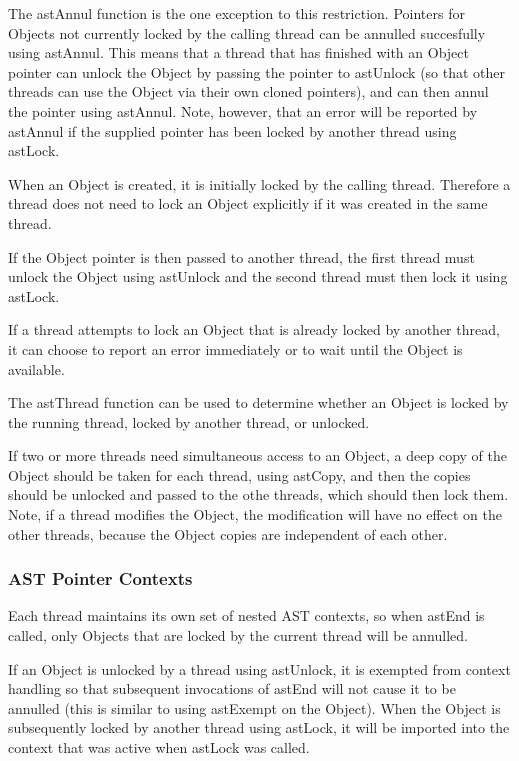 \documentclass[twoside,11pt]{article}
\begin{document}
The astAnnul function is the one exception to this restriction. Pointers
for Objects not currently locked by the calling thread can be annulled
succesfully using astAnnul. This means that a thread that has finished
with an Object pointer can unlock the Object by passing the pointer to
astUnlock (so that other threads can use the Object via their own cloned
pointers), and can then annul the pointer using astAnnul. Note, however,
that an error will be reported by astAnnul if the supplied pointer has
been locked by another thread using astLock.

When an Object is created, it is initially locked by the calling thread.
Therefore a thread does not need to lock an Object explicitly if it was
created in the same thread.

If the Object pointer is then passed to another thread, the first thread
must unlock the Object using astUnlock and the second thread must then lock
it using astLock.

If a thread attempts to lock an Object that is already locked by another
thread, it can choose to report an error immediately or to wait until the
Object is available.

The astThread function can be used to determine whether an Object is
locked by the running thread, locked by another thread, or unlocked.

If two or more threads need simultaneous access to an Object, a deep copy
of the Object should be taken for each thread, using astCopy, and then
the copies should be unlocked and passed to the othe threads, which
should then lock them. Note, if a thread modifies the Object, the
modification will have no effect on the other threads, because the Object
copies are independent of each other.

\subsubsection{AST Pointer Contexts}

Each thread maintains its own set of nested AST contexts, so when astEnd
is called, only Objects that are locked by the current thread will
be annulled.

If an Object is unlocked by a thread using astUnlock, it is exempted from
context handling so that subsequent invocations of astEnd will not cause it
to be annulled (this is similar to using astExempt on the Object). When the
Object is subsequently locked by another thread using astLock, it will be
imported into the context that was active when astLock was called.
\end{document}
